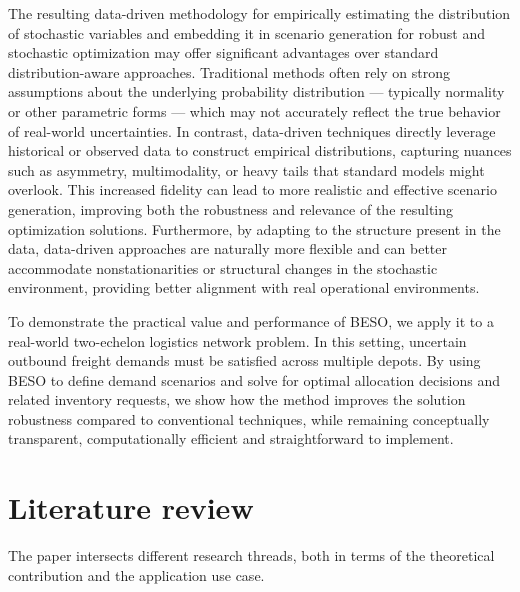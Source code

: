 \documentclass[ijoc,sglanonrev]{informs4}
\begin{document}
The resulting data-driven methodology for empirically estimating the distribution of stochastic variables and embedding it in scenario generation for robust and stochastic optimization may offer significant advantages over standard distribution-aware approaches. Traditional methods often rely on strong assumptions about the underlying probability distribution — typically normality or other parametric forms — which may not accurately reflect the true behavior of real-world uncertainties. In contrast, data-driven techniques directly leverage historical or observed data to construct empirical distributions, capturing nuances such as asymmetry, multimodality, or heavy tails that standard models might overlook. This increased fidelity can lead to more realistic and effective scenario generation, improving both the robustness and relevance of the resulting optimization solutions. Furthermore, by adapting to the structure present in the data, data-driven approaches are naturally more flexible and can better accommodate nonstationarities or structural changes in the stochastic environment, providing better alignment with real operational environments.

To demonstrate the practical value and performance of BESO, we apply it to a real-world two-echelon logistics network problem. In this setting, uncertain outbound freight demands must be satisfied across multiple depots. By using BESO to define demand scenarios and solve for optimal allocation decisions and related inventory requests, we show how the method improves the solution robustness compared to conventional techniques, while remaining conceptually transparent, computationally efficient and straightforward to implement.


\section{Literature review} \label{Sec:literature}

The paper intersects different research threads, both in terms of the theoretical contribution and the application use case.
\end{document}
